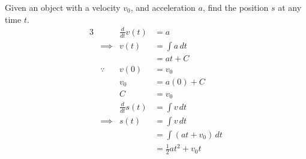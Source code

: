 \documentclass[twoside]{report}
\begin{document}
    \np
    \begin{example}
        Given an object with a velocity $v_0$, and acceleration $a$, find the position $s$ at any time $t$.
        \begin{alignat}{3}
            &&\frac{d}{dt}v(t) &= a\\
            &\implies &v(t) &= \int a\,dt\\
            &&&= at + C\\
            &\because & v(0) &= v_{0}\\
            &&v_{0} &= a(0) + C\\
            &&C &= v_{0}\\
            &&\frac{d}{dt}s(t) &= \int v\,dt\\
            &\implies& s(t) &= \int v\,dt\\
            &&&= \int (at + v_{0})\,dt\\
            &&&= \frac{1}{2}a t^{2} + v_{0}t
        \end{alignat}
    \end{example}
\end{document}
